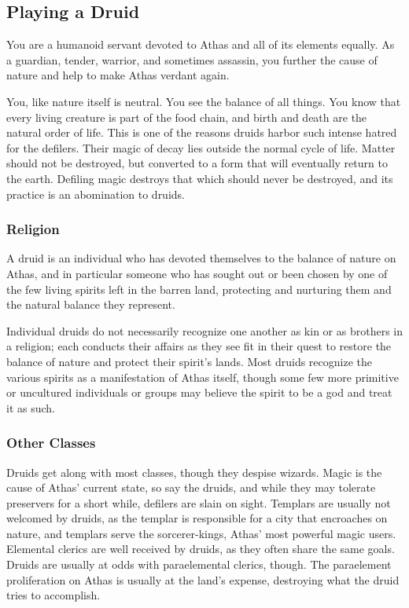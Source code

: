 \subsection{Playing a Druid}
You are a humanoid servant devoted to Athas and all of its elements equally. As a guardian, tender, warrior, and sometimes assassin, you further the cause of nature and help to make Athas verdant again.

You, like nature itself is neutral. You see the balance of all things. You know that every living creature is part of the food chain, and birth and death are the natural order of life. This is one of the reasons druids harbor such intense hatred for the defilers. Their magic of decay lies outside the normal cycle of life. Matter should not be destroyed, but converted to a form that will eventually return to the earth. Defiling magic destroys that which should never be destroyed, and its practice is an abomination to druids.

\subsubsection{Religion}
A druid is an individual who has devoted themselves to the balance of nature on Athas, and in particular someone who has sought out or been chosen by one of the few living spirits left in the barren land, protecting and nurturing them and the natural balance they represent.

Individual druids do not necessarily recognize one another as kin or as brothers in a religion; each conducts their affairs as they see fit in their quest to restore the balance of nature and protect their spirit's lands. Most druids recognize the various spirits as a manifestation of Athas itself, though some few more primitive or uncultured individuals or groups may believe the spirit to be a god and treat it as such.

\subsubsection{Other Classes}
Druids get along with most classes, though they despise wizards. Magic is the cause of Athas' current state, so say the druids, and while they may tolerate preservers for a short while, defilers are slain on sight. Templars are usually not welcomed by druids, as the templar is responsible for a city that encroaches on nature, and templars serve the sorcerer-kings, Athas' most powerful magic users. Elemental clerics are well received by druids, as they often share the same goals. Druids are usually at odds with paraelemental clerics, though. The paraelement proliferation on Athas is usually at the land's expense, destroying what the druid tries to accomplish.

